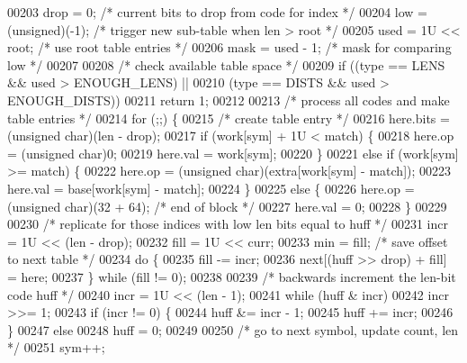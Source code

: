 \begin{DoxyCode}
00203     drop = 0;                   \textcolor{comment}{/* current bits to drop from code for index */}
00204     low = (unsigned)(-1);       \textcolor{comment}{/* trigger new sub-table when len > root */}
00205     used = 1U << root;          \textcolor{comment}{/* use root table entries */}
00206     mask = used - 1;            \textcolor{comment}{/* mask for comparing low */}
00207 
00208     \textcolor{comment}{/* check available table space */}
00209     \textcolor{keywordflow}{if} ((type == LENS && used > ENOUGH\_LENS) ||
00210         (type == DISTS && used > ENOUGH\_DISTS))
00211         \textcolor{keywordflow}{return} 1;
00212 
00213     \textcolor{comment}{/* process all codes and make table entries */}
00214     \textcolor{keywordflow}{for} (;;) \{
00215         \textcolor{comment}{/* create table entry */}
00216         here.bits = (\textcolor{keywordtype}{unsigned} char)(len - drop);
00217         \textcolor{keywordflow}{if} (work[sym] + 1U < match) \{
00218             here.op = (\textcolor{keywordtype}{unsigned} char)0;
00219             here.val = work[sym];
00220         \}
00221         \textcolor{keywordflow}{else} \textcolor{keywordflow}{if} (work[sym] >= match) \{
00222             here.op = (\textcolor{keywordtype}{unsigned} char)(extra[work[sym] - match]);
00223             here.val = base[work[sym] - match];
00224         \}
00225         \textcolor{keywordflow}{else} \{
00226             here.op = (\textcolor{keywordtype}{unsigned} char)(32 + 64);         \textcolor{comment}{/* end of block */}
00227             here.val = 0;
00228         \}
00229 
00230         \textcolor{comment}{/* replicate for those indices with low len bits equal to huff */}
00231         incr = 1U << (len - drop);
00232         fill = 1U << curr;
00233         min = fill;                 \textcolor{comment}{/* save offset to next table */}
00234         \textcolor{keywordflow}{do} \{
00235             fill -= incr;
00236             next[(huff >> drop) + fill] = here;
00237         \} \textcolor{keywordflow}{while} (fill != 0);
00238 
00239         \textcolor{comment}{/* backwards increment the len-bit code huff */}
00240         incr = 1U << (len - 1);
00241         \textcolor{keywordflow}{while} (huff & incr)
00242             incr >>= 1;
00243         \textcolor{keywordflow}{if} (incr != 0) \{
00244             huff &= incr - 1;
00245             huff += incr;
00246         \}
00247         \textcolor{keywordflow}{else}
00248             huff = 0;
00249 
00250         \textcolor{comment}{/* go to next symbol, update count, len */}
00251         sym++;

\end{DoxyCode}
